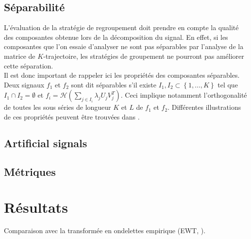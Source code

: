 \documentclass{gretsi}
\begin{document}
\subsection{Séparabilité}
\label{sub:sep}
    L'évaluation de la stratégie de regroupement doit prendre en compte la qualité des composantes obtenue lors de la décomposition du signal. En effet, si les composantes que l'on essaie d'analyser ne sont pas séparables par l'analyse de la matrice de $K$-trajectoire, les stratégies de groupement ne pourront pas améliorer cette séparation.\\
    
    Il est donc important de rappeler ici les propriétés des composantes séparables. Deux signaux $f_1$ et $f_2$ sont dit séparables s'il existe $I_1, I_2 \subset \left \{ 1,\dots, K \right \}$ tel que $I_1\cap I_2 = \emptyset$ et $f_i = \mathcal H(\sum_{j \in I_i} \lambda_j U_j V_j^T)$. Ceci implique notamment l'orthogonalité de toutes les sous séries de longueur $K$ et $L$ de $f_1$ et $f_2$. Différentes illustrations de ces propriétés peuvent être trouvées dans \cite{GNZ_10_SSA}.


\subsection{Artificial signals}
\label{sub:}

\subsection{Métriques}
\label{sub:met}


\section{Résultats} 

Comparaison avec la transformée en ondelettes empirique (EWT, \cite{gilles_13_EWT}).\\
\end{document}
